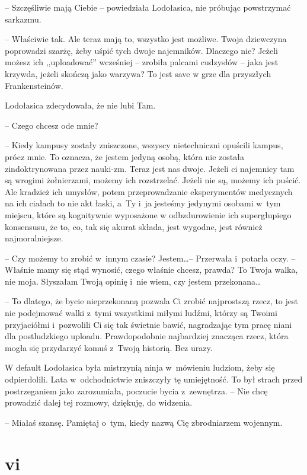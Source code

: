 \documentclass[oneside,polish,11pt,sfheadings]{mwbk}
\begin{document}
-- Szczęśliwie mają Ciebie -- powiedziała Lodołasica, nie próbując
powstrzymać sarkazmu.

-- Właściwie tak. Ale teraz mają to, wszystko jest możliwe. Twoja
dziewczyna poprowadzi szarżę, żeby uśpić tych dwoje najemników. Dlaczego
nie? Jeżeli możesz ich ,,uploadować'' wcześniej -- zrobiła palcami
cudzysłów -- jaka jest krzywda, jeżeli skończą jako warzywa? To jest save
w grze dla przyszłych Frankensteinów.

Lodołasica zdecydowała, że nie lubi Tam. 

-- Czego chcesz ode mnie?

-- Kiedy kampusy zostały zniszczone, wszyscy nietechniczni opuścili
kampus, prócz mnie. To oznacza, że jestem jedyną osobą, która nie
została zindoktrynowana przez nauki-zm. Teraz jest nas dwoje. Jeżeli ci
najemnicy tam są wrogimi żołnierzami, możemy ich rozstrzelać. Jeżeli nie
są, możemy ich puścić. Ale kradzież ich umysłów, potem przeprowadzanie
eksperymentów medycznych na ich ciałach to nie akt łaski, a~Ty i~ja
jesteśmy jedynymi osobami w~tym miejscu, które są kognitywnie wyposażone
w odbzdurowienie ich supergłupiego konsensusu, że to, co, tak się akurat
składa, jest wygodne, jest również najmoralniejsze.

-- Czy możemy to zrobić w~innym czasie? Jestem\ldots  -- Przerwała i~potarła
oczy. -- Właśnie mamy się stąd wynosić, czego właśnie chcesz, prawda? To
Twoja walka, nie moja. Słyszałam Twoją opinię i~nie wiem, czy jestem
przekonana\ldots 

-- To dlatego, że bycie nieprzekonaną pozwala Ci zrobić najprostszą
rzecz, to jest nie podejmować walki z~tymi wszystkimi miłymi ludźmi,
którzy są Twoimi przyjaciółmi i~pozwolili Ci się tak świetnie bawić,
nagradzając tym pracę niani dla postludzkiego uploadu. Prawdopodobnie
najbardziej znacząca rzecz, która mogła się przydarzyć komuś z~Twoją
historią. Bez urazy.

W default Lodołasica była mistrzynią ninja w~mówieniu ludziom, żeby się
odpierdolili. Lata w~odchodnictwie zniszczyły tę umiejętność. To był
strach przed postrzeganiem jako zarozumiała, poczucie bycia z~zewnętrza.
-- Nie chcę prowadzić dalej tej rozmowy, dziękuję, do widzenia.

-- Miałaś szansę. Pamiętaj o~tym, kiedy nazwą Cię zbrodniarzem wojennym.

\chapter*{vi}
\end{document}
